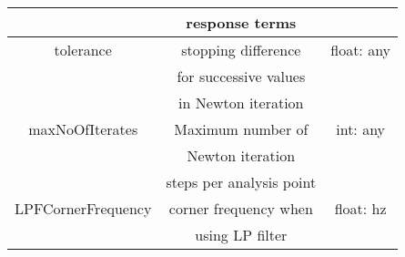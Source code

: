 \begin{table}
{\begin{tabular}{|c|c|c|}
             & response terms            & \\
\hline
tolerance & stopping difference & float: any\\
          & for successive values & \\
          & in Newton iteration   & \\
\hline
maxNoOfIterates & Maximum number of & int: any \\
                & Newton iteration  & \\
                & steps per analysis point & \\
\hline
LPFCornerFrequency & corner frequency when & float: hz\\
                   & using LP filter & \\
\hline
\end{tabular}
}
\end{table}
